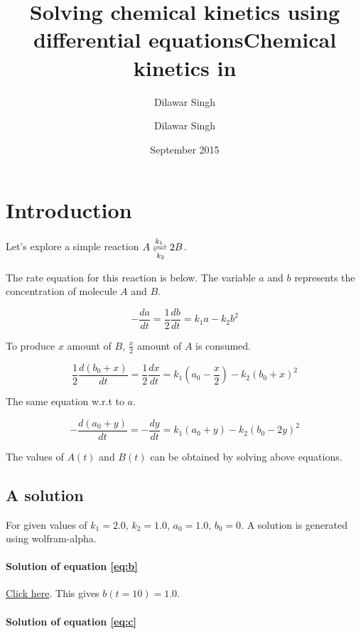 \documentclass[a4paper,10pt]{article}
\title{Solving chemical kinetics using differential equations}
\author{Dilawar Singh}
\date{September 2015}
\title{Chemical kinetics in \MOOSE}
\author{Dilawar Singh}
\begin{document}
\maketitle

\section{Introduction}

Let's explore a simple reaction $ A \xrightleftharpoons[k_2]{k_1} 2B $.

The rate equation for this reaction is below. The variable $a$ and $b$
represents the concentration of molecule $A$ and $B$.

\begin{equation}
\label{eq:a}
- \frac{da}{dt} = \frac{1}{2} \frac{db}{dt} =   k_1 a - k_2 b^2 
\end{equation}

To produce $x$ amount of $B$, $\frac{x}{2}$ amount of $A$ is consumed. 

\begin{equation}
\label{eq:b}
  \frac{1}{2} \frac{d(b_0 + x)}{dt} = \frac{1}{2}\frac{dx}{dt} =  k_1(a_0 - \frac{x}{2}) - k_2(b_0+x)^2
\end{equation}
 
The same equation w.r.t to $a$.

\begin{equation}
\label{eq:c}
- \frac{d(a_0 + y)}{dt} = - \frac{dy}{dt} = k_1(a_0 + y) - k_2(b_0 - 2y)^2 
\end{equation}

The values of $A(t)$ and $B(t)$ can be obtained by solving above equations. 

\subsection{A solution}

For given values of $k_1 = 2.0$, $k_2 = 1.0$, $a_0 = 1.0$, $b_0 = 0$. A solution
is generated using wolfram-alpha.

\paragraph{Solution of equation \ref{eq:b}}

\href{http://www.wolframalpha.com/input/?i=x%27%3D4%281-x%2F2%29-2%28x%29^2%2C++x%280%29+%3D+0%2C+t+%3D+10&h=1}{Click
here}. This gives $b(t = 10) = 1.0 $.

\paragraph{Solution of equation \ref{eq:c}} 
\end{document}

